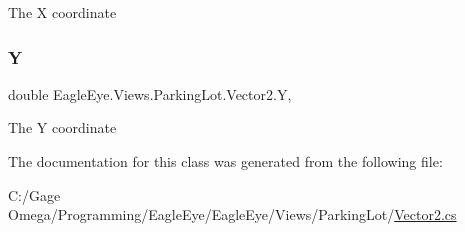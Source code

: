 The X coordinate 

\mbox{\label{class_eagle_eye_1_1_views_1_1_parking_lot_1_1_vector2_aac35e7838fd7858b43c98df7e7d3c483}} 
\subsubsection{\texorpdfstring{Y}{Y}}
{\footnotesize\ttfamily double Eagle\+Eye.\+Views.\+Parking\+Lot.\+Vector2.\+Y\hspace{0.3cm}{\ttfamily [get]}, {\ttfamily [set]}}



The Y coordinate 



The documentation for this class was generated from the following file\+:\begin{DoxyCompactItemize}
\item 
C\+:/\+Gage Omega/\+Programming/\+Eagle\+Eye/\+Eagle\+Eye/\+Views/\+Parking\+Lot/\mbox{\hyperlink{_views_2_parking_lot_2_vector2_8cs}{Vector2.\+cs}}\end{DoxyCompactItemize}
